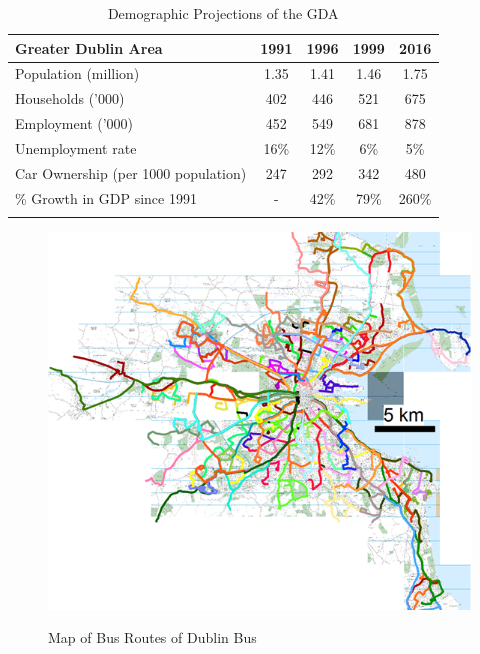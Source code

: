 \begin{table}[htbp]
\footnotesize{}  \vspace{10pt} \begin{longtable} {p{190pt}cccc}
\caption{Demographic Projections of the GDA} \\
\hline

\textbf{Greater Dublin Area}&

\textbf{1991}  & \textbf{1996}& \textbf{1999}& \textbf{2016} \\* \hline \hline {Population
(million) }&

{1.35}  & {1.41}& {1.46}& {1.75} \\* \hline {Households ('000) }&

{402}  & {446}& {521}& {675} \\* \hline {Employment ('000) }&

{452}  & {549}& {681}& {878} \\* \hline {Unemployment rate }&

{16{\%}}  & {12{\%}}& {6{\%}}& {5{\%}} \\* \hline {Car Ownership (per 1000 population)}&

{247}  & {292}& {342}& {480} \\* \hline {{\%} Growth in GDP since 1991}& {- }& {42{\%}}& {79{\%}}&
{260{\%} }\\* \hline

\label{Table: Demographic Projections of the GDA}
\end{longtable}
 \normalsize{} 
\end{table}

\newpage

\begin{figure}[htbp]
\center \includegraphics[width=400pt]{intro2}\\
\caption{Map of Bus Routes of Dublin Bus} \label{fig2: Map of bus routes provided by Dublin Bus}
\end{figure}

